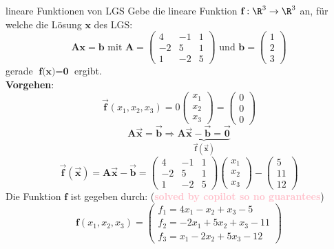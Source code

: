 \begin{example2}{lineare Funktionen von LGS}
    Gebe die lineare Funktion $\textbf{f}: \R^3 \to \R^3$ an, für welche die Lösung $\textbf{x}$ des LGS:
    $$\textbf{Ax} = \textbf{b} \text{ mit } \textbf{A} = \begin{pmatrix} 4 & -1 & 1 \\ -2 & 5 & 1 \\ 1 & -2 & 5 \end{pmatrix} \text{ und } \textbf{b} = \begin{pmatrix} 1 \\ 2 \\ 3 \end{pmatrix}$$
    gerade $\textbf{f(x)} = \textbf{0}$ ergibt.
    \vspace{2mm} \\
    \textbf{Vorgehen}: \\
    $$\overrightarrow{\textbf{f}}(x_1, x_2, x_3) = 0 \begin{pmatrix} x_1 \\ x_2 \\ x_3 \end{pmatrix} = \begin{pmatrix} 0 \\ 0 \\ 0 \end{pmatrix}$$
    $$\textbf{A} \overrightarrow{\textbf{x}} = \overrightarrow{\textbf{b}} \Rightarrow \underbrace{\textbf{A} \overrightarrow{\textbf{x}} - \overrightarrow{\textbf{b}} = \overrightarrow{\textbf{0}}}_{\overrightarrow{\textbf{f}}(\overrightarrow{\textbf{x}})}$$
    \tcblower
    $$\overrightarrow{\textbf{f}}(\overrightarrow{\textbf{x}}) = \textbf{A} \overrightarrow{\textbf{x}} - \overrightarrow{\textbf{b}} = \begin{pmatrix} 4 & -1 & 1 \\ -2 & 5 & 1 \\ 1 & -2 & 5 \end{pmatrix} \begin{pmatrix} x_1 \\ x_2 \\ x_3 \end{pmatrix} - \begin{pmatrix} 5 \\ 11 \\ 12 \end{pmatrix}$$
    Die Funktion $\textbf{f}$ ist gegeben durch: (\textcolor{pink}{\textbf{solved by copilot so no guarantees}})
    $$\textbf{f}(x_1, x_2, x_3) = \begin{pmatrix} f_1 = 4x_1 - x_2 + x_3 - 5 \\ f_2 = -2x_1 + 5x_2 + x_3 - 11 \\ f_3 = x_1 - 2x_2 + 5x_3 - 12 \end{pmatrix}$$
\end{example2}

